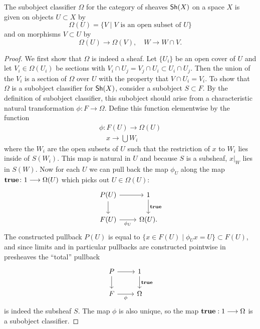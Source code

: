\begin{proposition}\label{prop:classifier}
	The subobject classifier $\Omega$ for the category of sheaves $\operatorname{\mathsf{Sh}}(X)$ on a space $X$ is given on objects $U \subset X$ by
	\[
		\Omega(U) = \{ V \mid V \text{ is an open subset of } U \}
	\]
	and on morphisms $V \subset U$ by
	\[
		\Omega(U) \to \Omega(V),\quad W \to W \cap V.
	\]
\end{proposition}

\begin{proof}
	We first show that $\Omega$ is indeed a sheaf. Let $\{U_i\}$ be an open cover of $U$ and let $V_i \in \Omega(U_i)$ be sections with $V_i \cap U_j = V_j \cap U_i \subset U_i \cap U_j$. Then the union of the $V_i$ is a section of $\Omega$ over $U$ with the property that $V \cap U_i = V_i$. To show that $\Omega$ is a subobject classifier for $\operatorname{\mathsf{Sh}}(X)$, consider a subobject $S \subset F$. By the definition of subobject classifier, this subobject should arise from a characteristic natural transformation $\phi \colon F \to \Omega$. Define this function elementwise by the function
	\begin{gather*}
		\phi \colon F(U) \to \Omega(U)\\
		\quad x \to \bigcup W_i
	\end{gather*}
	where the $W_i$ are the open subsets of $U$ such that the restriction of $x$ to $W_i$ lies inside of $S(W_i)$. This map is natural in $U$ and because $S$ is a subsheaf, $x|_W$ lies in $S(W)$. Now for each $U$  we can pull back the map $\phi_U$ along the map $\mathbf{true} \colon 1 \longrightarrow \Omega(U)$ which picks out $U \in \Omega(U)$:
	\[
		\begin{tikzcd}
			P(U) & 1 \\
			F(U) & \Omega(U)
			\arrow[from=1-1, to=2-1]
			\arrow[from=1-1, to=1-2]
			\arrow["\true", from=1-2, to=2-2]
			\arrow["\phi_U"', from=2-1, to=2-2].
		\end{tikzcd}
	\]
	The constructed pullback $P(U)$ is equal to $\{x \in F(U) \mid \phi_U x = U\} \subset F(U)$, and since limits and in particular pullbacks are constructed pointwise in presheaves the ``total'' pullback
	\[
		\begin{tikzcd}
			P & 1 \\
			F & \Omega
			\arrow[from=1-1, to=2-1]
			\arrow[from=1-1, to=1-2]
			\arrow["{\true}", from=1-2, to=2-2]
			\arrow["\phi"', from=2-1, to=2-2]
		\end{tikzcd}
	\]
	is indeed the subsheaf $S$. The map $\phi$ is also unique, so the map $\mathbf{true}: 1 \longrightarrow \Omega$ is a subobject classifier.
\end{proof}

